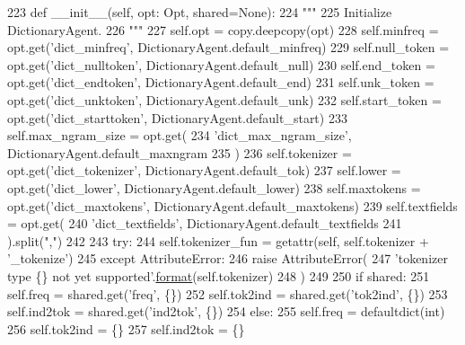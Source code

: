 \begin{DoxyCode}
223     \textcolor{keyword}{def }\_\_init\_\_(self, opt: Opt, shared=\textcolor{keywordtype}{None}):
224         \textcolor{stringliteral}{"""}
225 \textcolor{stringliteral}{        Initialize DictionaryAgent.}
226 \textcolor{stringliteral}{        """}
227         self.opt = copy.deepcopy(opt)
228         self.minfreq = opt.get(\textcolor{stringliteral}{'dict\_minfreq'}, DictionaryAgent.default\_minfreq)
229         self.null\_token = opt.get(\textcolor{stringliteral}{'dict\_nulltoken'}, DictionaryAgent.default\_null)
230         self.end\_token = opt.get(\textcolor{stringliteral}{'dict\_endtoken'}, DictionaryAgent.default\_end)
231         self.unk\_token = opt.get(\textcolor{stringliteral}{'dict\_unktoken'}, DictionaryAgent.default\_unk)
232         self.start\_token = opt.get(\textcolor{stringliteral}{'dict\_starttoken'}, DictionaryAgent.default\_start)
233         self.max\_ngram\_size = opt.get(
234             \textcolor{stringliteral}{'dict\_max\_ngram\_size'}, DictionaryAgent.default\_maxngram
235         )
236         self.tokenizer = opt.get(\textcolor{stringliteral}{'dict\_tokenizer'}, DictionaryAgent.default\_tok)
237         self.lower = opt.get(\textcolor{stringliteral}{'dict\_lower'}, DictionaryAgent.default\_lower)
238         self.maxtokens = opt.get(\textcolor{stringliteral}{'dict\_maxtokens'}, DictionaryAgent.default\_maxtokens)
239         self.textfields = opt.get(
240             \textcolor{stringliteral}{'dict\_textfields'}, DictionaryAgent.default\_textfields
241         ).split(\textcolor{stringliteral}{","})
242 
243         \textcolor{keywordflow}{try}:
244             self.tokenizer\_fun = getattr(self, self.tokenizer + \textcolor{stringliteral}{'\_tokenize'})
245         \textcolor{keywordflow}{except} AttributeError:
246             \textcolor{keywordflow}{raise} AttributeError(
247                 \textcolor{stringliteral}{'tokenizer type \{\} not yet supported'}.\hyperlink{namespaceparlai_1_1chat__service_1_1services_1_1messenger_1_1shared__utils_a32e2e2022b824fbaf80c747160b52a76}{format}(self.tokenizer)
248             )
249 
250         \textcolor{keywordflow}{if} shared:
251             self.freq = shared.get(\textcolor{stringliteral}{'freq'}, \{\})
252             self.tok2ind = shared.get(\textcolor{stringliteral}{'tok2ind'}, \{\})
253             self.ind2tok = shared.get(\textcolor{stringliteral}{'ind2tok'}, \{\})
254         \textcolor{keywordflow}{else}:
255             self.freq = defaultdict(int)
256             self.tok2ind = \{\}
257             self.ind2tok = \{\}

\end{DoxyCode}
